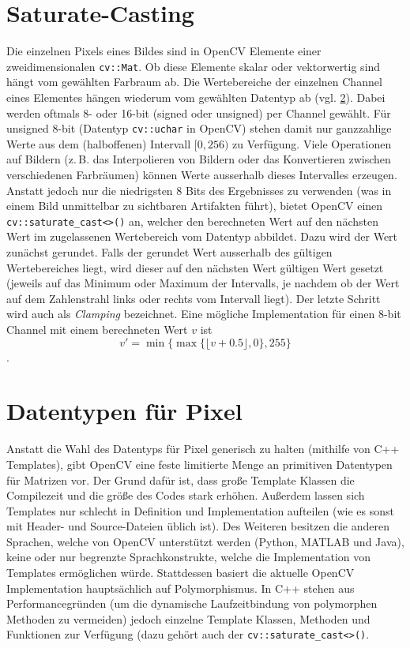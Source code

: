 \documentclass{whswinvcbook}
\begin{document}
\section{Saturate-Casting}\label{section-sat}
Die einzelnen Pixels eines Bildes sind in OpenCV Elemente einer zweidimensionalen \texttt{cv::Mat}. Ob diese Elemente skalar oder vektorwertig sind hängt vom gewählten Farbraum ab. Die Wertebereiche der einzelnen Channel eines Elementes hängen wiederum vom gewählten Datentyp ab (vgl. \ref{section-pixeltypes}). Dabei werden oftmals 8- oder 16-bit (signed oder unsigned) per Channel gewählt. Für unsigned 8-bit (Datentyp \texttt{cv::uchar} in OpenCV) stehen damit nur ganzzahlige Werte aus dem (halboffenen) Intervall $[0, 256)$ zu Verfügung. Viele Operationen auf Bildern (z.\,B. das Interpolieren von Bildern oder das Konvertieren zwischen verschiedenen Farbräumen) können Werte ausserhalb dieses Intervalles erzeugen. Anstatt jedoch nur die niedrigsten 8 Bits des Ergebnisses zu verwenden (was in einem Bild unmittelbar zu sichtbaren Artifakten führt), bietet OpenCV einen \texttt{cv::saturate\_cast<>()} an, welcher den berechneten Wert auf den nächsten Wert im zugelassenen Wertebereich vom Datentyp abbildet. Dazu wird der Wert zunächst gerundet. Falls der gerundet Wert ausserhalb des gültigen Wertebereiches liegt, wird dieser auf den nächsten Wert gültigen Wert gesetzt (jeweils auf das Minimum oder Maximum der Intervalls, je nachdem ob der Wert auf dem Zahlenstrahl links oder rechts vom Intervall liegt). Der letzte Schritt wird auch als \textit{Clamping} bezeichnet. Eine mögliche Implementation\cite{opencv3} für einen 8-bit Channel mit einem berechneten Wert $v$ ist $$v'=\min\{\max\{\lfloor v+0.5\rfloor,0\},255\}$$.
\section{Datentypen für Pixel}\label{section-pixeltypes}
Anstatt die Wahl des Datentyps für Pixel generisch zu halten (mithilfe von C++ Templates), gibt OpenCV eine feste limitierte Menge an primitiven Datentypen für Matrizen vor.\cite{opencv3} Der Grund dafür ist, dass große Template Klassen die Compilezeit und die größe des Codes stark erhöhen. Außerdem lassen sich Templates nur schlecht in Definition und Implementation aufteilen (wie es sonst mit Header- und Source-Dateien üblich ist). Des Weiteren besitzen die anderen Sprachen, welche von OpenCV unterstützt werden (Python, MATLAB und Java), keine oder nur begrenzte Sprachkonstrukte, welche die Implementation von Templates ermöglichen würde. Stattdessen basiert die aktuelle OpenCV Implementation hauptsächlich auf Polymorphismus. In C++ stehen aus Performancegründen (um die dynamische Laufzeitbindung von polymorphen Methoden zu vermeiden) jedoch einzelne Template Klassen, Methoden und Funktionen zur Verfügung (dazu gehört auch der \texttt{cv::saturate\_cast<>()}.
\end{document}
